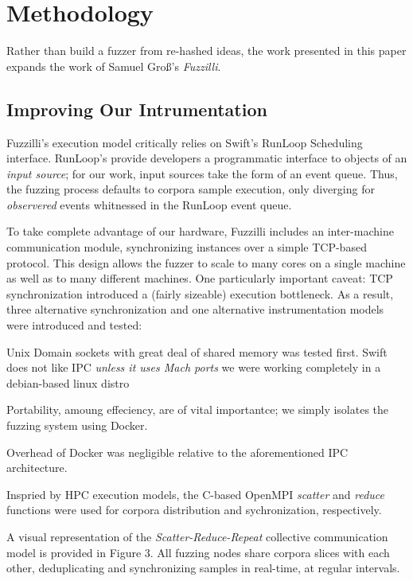 \section{Methodology}
Rather than build a fuzzer from re-hashed ideas, the work presented in this paper expands the work of Samuel Gro{\ss}'s \textit{Fuzzilli}.

\subsection{Improving Our Intrumentation}

Fuzzilli's execution model critically relies on Swift's RunLoop Scheduling interface\cite{apple_dev_doc}.
RunLoop's provide developers a programmatic interface to objects of an \textit{input source}; for our work, input sources take the form of an event queue. Thus,
the fuzzing process defaults to corpora sample execution, only diverging for \textit{observered} events whitnessed in the RunLoop event queue.

To take complete advantage of our hardware, Fuzzilli includes an inter-machine communication module, synchronizing instances
over a simple TCP-based protocol. This design allows the fuzzer to scale to many cores on a single machine as well as to many
different machines. One particularly important caveat: TCP synchronization introduced a (fairly sizeable) execution bottleneck. As a result,
three alternative synchronization and one alternative instrumentation models were introduced and tested:\vspace{-1em}

 Unix Domain sockets with great deal of shared memory was tested first.
Swift does not like IPC \textit{unless it uses Mach ports}
we were working completely in a debian-based linux distro
\vspace{-1em}

 Portability, amoung effeciency, are of vital importantce; we simply isolates the
fuzzing system using Docker.

Overhead of Docker was negligible relative to the aforementioned IPC architecture.
\vspace{-1em}

 Inspried by HPC execution models, the C-based OpenMPI
\textit{scatter} and \textit{reduce} functions were used for corpora distribution and sychronization, respectively.

A visual representation of the \textit{Scatter-Reduce-Repeat} collective communication model is provided in Figure 3.
All fuzzing nodes share corpora slices with each other, deduplicating and synchronizing samples in real-time, at regular intervals.

